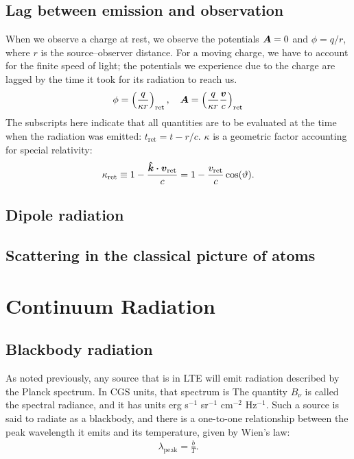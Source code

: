 \subsection{Lag between emission and observation}
When we observe a charge at rest, we observe the potentials $\vb*{A} = 0$ and $\phi = q/r$, where $r$ is the source--observer distance. For a moving charge, we have to account for the finite speed of light; the potentials we experience due to the charge are lagged by the time it took for its radiation to reach us.
\begin{align}
    \phi = \left ( \frac{q}{\kappa r} \right )_\text{ret}, \quad \vb*{A} = \left ( \frac{q}{\kappa r} \frac{\vb*{v}}{c} \right )_\text{ret}
\end{align}
The subscripts here indicate that all quantities are to be evaluated at the time when the radiation was emitted: $t_\text{ret} = t - r/c$. $\kappa$ is a geometric factor accounting for special relativity:
\begin{align}
    \kappa_\text{ret} \equiv 1 - \frac{\vu*{k} \vdot \vb*{v}_\text{ret}}{c} = 1 - \frac{v_\text{ret}}{c} \cos(\vartheta).
\end{align}

\subsection{Dipole radiation}

\subsection{Scattering in the classical picture of atoms}


\section{Continuum Radiation}
\subsection{Blackbody radiation}
As noted previously, any source that is in LTE will emit radiation described by the Planck spectrum. In CGS units, that spectrum is
The quantity $B_\nu$ is called the spectral radiance, and it has units erg s$^{-1}$ sr$^{-1}$ cm$^{-2}$ Hz$^{-1}$. Such a source is said to radiate as a blackbody, and there is a one-to-one relationship between the peak wavelength it emits and its temperature, given by Wien's law:
\begin{align} \label{eq:wien}
    \lambda_\text{peak} = \frac{b}{T}.
\end{align}

